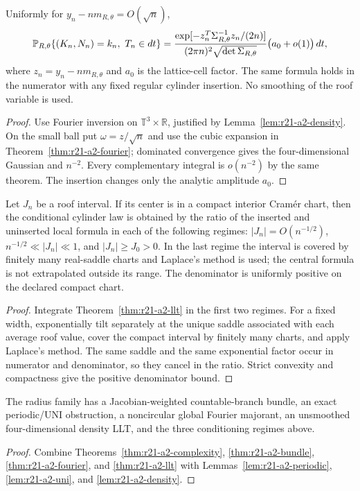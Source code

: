 \begin{theorem}
\label{thm:r21-a2-llt}
Uniformly for $y_n-nm_{R,\theta}=O(\sqrt n)$,
\[
 \mathbb P_{R,\theta}
 \{(K_n,N_n)=k_n,\ T_n\in dt\}
 ={\exp[-z_n^T\Sigma_{R,\theta}^{-1}z_n/(2n)]
   \over(2\pi n)^2\sqrt{\det\Sigma_{R,\theta}}}
 \bigl(a_0+o(1)\bigr)\,dt,
\]
where $z_n=y_n-nm_{R,\theta}$ and $a_0$ is the lattice-cell factor.  The same
formula holds in the numerator with any fixed regular cylinder insertion.
No smoothing of the roof variable is used.
\end{theorem}

\begin{proof}
Use Fourier inversion on $\mathbb T^3\times\mathbb R$, justified by
Lemma~\ref{lem:r21-a2-density}.  On the small ball put
$\omega=z/\sqrt n$ and use the cubic expansion in
Theorem~\ref{thm:r21-a2-fourier}; dominated convergence gives the
four-dimensional Gaussian and $n^{-2}$.  Every complementary integral is
$o(n^{-2})$ by the same theorem.  The insertion changes only the analytic
amplitude $a_0$.
\end{proof}

\begin{corollary}
\label{cor:r21-a2-conditioning}
Let $J_n$ be a roof interval.  If its center is in a compact interior Cram\'er
chart, then the conditional cylinder law is obtained by the ratio of the
inserted and uninserted local formula in each of the following regimes:
$|J_n|=O(n^{-1/2})$, $n^{-1/2}\ll|J_n|\ll1$, and
$|J_n|\ge J_0>0$.  In the last regime the interval is covered by finitely many
real-saddle charts and Laplace's method is used; the central formula is not
extrapolated outside its range.  The denominator is uniformly positive on
the declared compact chart.
\end{corollary}

\begin{proof}
Integrate Theorem~\ref{thm:r21-a2-llt} in the first two regimes.  For a fixed
width, exponentially tilt separately at the unique saddle associated with
each average roof value, cover the compact interval by finitely many charts,
and apply Laplace's method.  The same saddle and the same exponential factor
occur in numerator and denominator, so they cancel in the ratio.  Strict
convexity and compactness give the positive denominator bound.
\end{proof}

\begin{theorem}
\label{thm:r21-a2-main}
The radius family has a Jacobian-weighted countable-branch bundle, an exact
periodic/UNI obstruction, a noncircular global Fourier majorant, an
unsmoothed four-dimensional density LLT, and the three conditioning regimes
above.
\end{theorem}

\begin{proof}
Combine Theorems~\ref{thm:r21-a2-complexity},
\ref{thm:r21-a2-bundle}, \ref{thm:r21-a2-fourier}, and
\ref{thm:r21-a2-llt} with Lemmas~\ref{lem:r21-a2-periodic},
\ref{lem:r21-a2-uni}, and \ref{lem:r21-a2-density}.
\end{proof}
